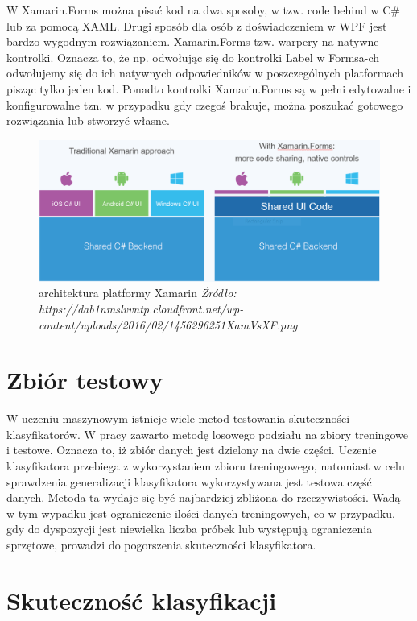 \documentclass[brudnopis]{xmgr}
\begin{document}
W Xamarin.Forms\cite{6} można pisać kod na dwa sposoby, w tzw. code behind w C\# lub za pomocą XAML. Drugi sposób dla osób z doświadczeniem w WPF jest bardzo wygodnym rozwiązaniem. Xamarin.Forms tzw. warpery na natywne kontrolki. Oznacza to, że np. odwołując się do kontrolki Label w Formsa-ch odwołujemy się do ich natywnych odpowiedników w poszczególnych platformach pisząc tylko jeden kod. Ponadto kontrolki Xamarin.Forms są w pełni edytowalne i konfigurowalne tzn. w przypadku gdy czegoś brakuje, można poszukać gotowego rozwiązania lub stworzyć własne.

\begin{figure}[!tbh]
\centering
\includegraphics[width=1\hsize]{fig/xamarin}
\caption{architektura platformy Xamarin \emph{Źródło: https://dab1nmslvvntp.cloudfront.net/wp-content/uploads/2016/02/1456296251XamVsXF.png}}
\end{figure}
\newpage

\section{Zbiór testowy}

W uczeniu maszynowym istnieje wiele metod testowania skuteczności klasyfikatorów. W pracy zawarto metodę losowego podziału na zbiory treningowe i testowe. Oznacza to, iż zbiór danych jest dzielony na dwie części. Uczenie klasyfikatora przebiega z wykorzystaniem zbioru treningowego, natomiast w celu sprawdzenia generalizacji klasyfikatora wykorzystywana jest testowa część danych\cite{19}. Metoda ta wydaje się być najbardziej zbliżona do rzeczywistości. Wadą w tym wypadku jest ograniczenie ilości danych treningowych, co w przypadku, gdy do dyspozycji jest niewielka liczba próbek lub występują ograniczenia sprzętowe, prowadzi do pogorszenia skuteczności klasyfikatora.

\section{Skuteczność klasyfikacji}
\end{document}

